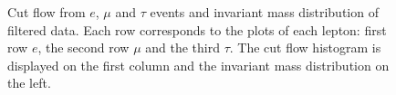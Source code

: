\documentclass[11 pt]{article}
\begin{document}
\begin{figure}[htbp]
\begin{subfigure}{0.45\textwidth}
    \end{subfigure}
    \hfill
    \begin{subfigure}{0.45\textwidth}
        \centering
    \end{subfigure}
    \caption{\small Cut flow from $e$, $\mu$ and $\tau$ events and invariant mass distribution of filtered data. Each row corresponds to the plots of each lepton: first row $e$, the second row $\mu$ and the third  $\tau$. The cut flow histogram is displayed on the first column and the invariant mass distribution on the left.}
    \label{fig:selected_events}
\end{figure}
\end{document}
